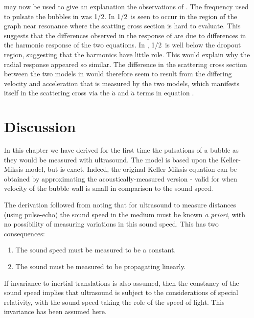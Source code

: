  may now be used to give an explanation the observations of .
The frequency used to pulsate the bubbles in  was \unit{1/2}\mega\hertz.
In  \unit{1/2}\mega\hertz\ is seen to occur in the region of the graph near resonance where 
the scatting cross section is hard to evaluate.
This suggests that the differences observed in the response of  
are due to differences in the harmonic response of the two equations.
In , \unit{1/2}\mega\hertz\ is well below the dropout region, 
suggesting that the harmonics have little role.
This would explain why the radial response appeared so similar.
The difference in the scattering cross section between the two models in  
would therefore seem to result from the differing velocity and acceleration that is measured by the two models,
which manifests itself in the scattering cross via the $\dot a$ and $\ddot a$ terms in equation .



\section{Discussion}

In this chapter we have derived for the first time the pulsations of a bubble as they would be measured with ultrasound.
The model is based upon the Keller-Miksis model, but is exact.
Indeed, the original Keller-Miksis equation can be obtained by approximating the acoustically-measured version -
valid for when velocity of the bubble wall is small in comparison to the sound speed.

The derivation followed from noting that for ultrasound to measure distances (using pulse-echo) 
the sound speed in the medium must be known {\em a priori}, 
with no possibility of measuring variations in this sound speed.
This has two consequences:
\begin{enumerate}
  \item The sound speed must be measured to be a constant.
  \item The sound must be measured to be propagating linearly.
\end{enumerate}
If invariance to inertial translations is also assumed,
then the constancy of the sound speed  implies that 
ultrasound is subject to the considerations of special relativity,
with the sound speed taking the role of the speed of light.
This invariance has been assumed here.

